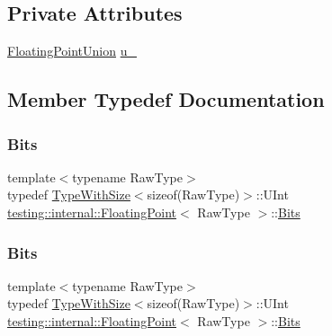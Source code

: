 \subsection*{Private Attributes}
\begin{DoxyCompactItemize}
\item 
\mbox{\hyperlink{uniontesting_1_1internal_1_1_floating_point_1_1_floating_point_union}{Floating\+Point\+Union}} \mbox{\hyperlink{classtesting_1_1internal_1_1_floating_point_a2e0b6bd427248b91476f3fca281f7104}{u\+\_\+}}
\end{DoxyCompactItemize}


\subsection{Member Typedef Documentation}
\mbox{\label{classtesting_1_1internal_1_1_floating_point_abf228bf6cd48f12c8b44c85b4971a731}} 
\subsubsection{\texorpdfstring{Bits}{Bits}\hspace{0.1cm}{\footnotesize\ttfamily [1/3]}}
{\footnotesize\ttfamily template$<$typename Raw\+Type$>$ \\
typedef \mbox{\hyperlink{classtesting_1_1internal_1_1_type_with_size}{Type\+With\+Size}}$<$sizeof(Raw\+Type)$>$\+::U\+Int \mbox{\hyperlink{classtesting_1_1internal_1_1_floating_point}{testing\+::internal\+::\+Floating\+Point}}$<$ Raw\+Type $>$\+::\mbox{\hyperlink{classtesting_1_1internal_1_1_floating_point_abf228bf6cd48f12c8b44c85b4971a731}{Bits}}}

\mbox{\label{classtesting_1_1internal_1_1_floating_point_abf228bf6cd48f12c8b44c85b4971a731}} 
\subsubsection{\texorpdfstring{Bits}{Bits}\hspace{0.1cm}{\footnotesize\ttfamily [2/3]}}
{\footnotesize\ttfamily template$<$typename Raw\+Type$>$ \\
typedef \mbox{\hyperlink{classtesting_1_1internal_1_1_type_with_size}{Type\+With\+Size}}$<$sizeof(Raw\+Type)$>$\+::U\+Int \mbox{\hyperlink{classtesting_1_1internal_1_1_floating_point}{testing\+::internal\+::\+Floating\+Point}}$<$ Raw\+Type $>$\+::\mbox{\hyperlink{classtesting_1_1internal_1_1_floating_point_abf228bf6cd48f12c8b44c85b4971a731}{Bits}}}


